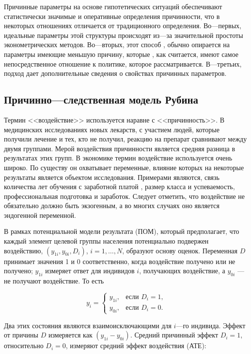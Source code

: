 	Причинные параметры на основе гипотетических ситуаций обеспечивают статистически значимые и оперативные определения причинности, что в некоторых отношениях отличается от традиционного определения. Во---первых, идеальные параметры этой структуры происходят из---за значительной простоты эконометрических методов. Во---вторых, этот способ , обычно опирается на параметры имеющие меньшую причину, которые , как считается, имеют самое непосредственное отношение к политике, которое рассматривается. В---третьих, подход дает дополнительные сведения о свойствах причинных параметров.
	
\subsection{Причинно---следственная модель Рубина}



Термин <<воздействие>> используется наравне с <<причинность>>. В медицинских исследованиях новых лекарств, с участием людей, которые получили лечение и тех, кто не получил, реакцию на препарат сравнивают между двумя группами. Мерой воздействия причинности является средняя разница в результатах этих групп. В экономике термин воздействие используется очень широко. По существу он охватывает переменные, влияние которых на некоторые результаты является объектом исследования. Примерами являются, связь количества лет обучения с заработной платой , размер класса и успеваемость, профессиональная подготовка и заработок. Следует отметить, что воздействие не обязательно должно быть экзогенным, а во многих случаях оно является эндогенной переменной.


	В рамках потенциальной модели результата (ПОМ), который предполагает, что каждый элемент целевой группы населения потенциально подвержен воздействию, $(y_{1i},y_{0i},D_{i})$, $i=1,\dots,N$, образуют основу оценок. Переменная $D$ принимает значения 1 и 0 соответственно, когда воздействие получено или не получено; $y_{1i}$ измеряет ответ для индивидов $i$, получающих воздействие, а $y_{0i}$ --- не получают воздействие. То есть


\begin{equation}
y_{i}=
\begin{cases}
y_{1i}, & \text{если $D_{i}=1$,} \\
y_{0i}, &  \text{если $D_{i}=0$.}
\end{cases}
\end{equation}

Два этих состояния являются взаимоисключающими для $i$---го индивида. Эффект от причины $D$ измеряется как $(y_{1i}-y_{0i})$. Средний причинный эффект $D_{i}=1$, относительно $D_{i}=0$, измеряют средний эффект воздействия (АТЕ):

